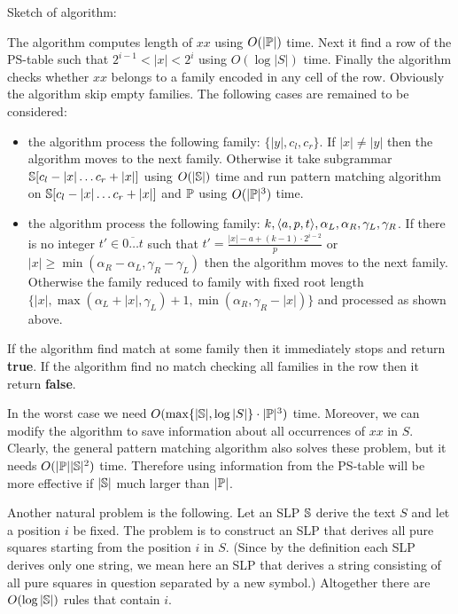 ﻿\documentclass[11pt]{article}
\begin{document}
Sketch of algorithm:

The algorithm computes length of $xx$ using $O(|\mathbb{P}|)$ time. Next it find a row of the PS-table such that
$2^{i-1} < |x| < 2^i$ using $O(\log{|S|})$ time. Finally the algorithm checks whether $xx$ belongs to a family encoded
in any cell of the row. Obviously the algorithm skip empty families. The following cases are remained to be
considered:

\begin{itemize}
  \item the algorithm process the following family: $\{|y|, c_l, c_r\}$. If $|x| \neq |y|$ then the algorithm moves to
  the next family. Otherwise it take subgrammar $\mathbb{S}[c_l - |x|\dots c_r + |x|]$ using $O(|\mathbb{S}|)$ time and run
  pattern matching algorithm on $\mathbb{S}[c_l - |x|\dots c_r + |x|]$ and $\mathbb{P}$ using $O(|\mathbb{P}|^3)$ time.
  \item the algorithm process the following family: $k, \langle a, p, t\rangle, \alpha_L, \alpha_R, \gamma_L, \gamma_R$. If
  there is no integer $t' \in \overline{0 \dots t}$ such that $t' = \frac{|x| - a + (k-1) \cdot 2^{i-2} }{p}$ or $|x|
  \geq \min(\alpha_R -\alpha_L, \gamma_R - \gamma_L)$ then the algorithm moves to the next family. Otherwise the
  family reduced to family with fixed root length $\{|x|, \max(\alpha_L + |x|, \gamma_L) + 1, \min(\alpha_R,
  \gamma_R - |x|)\}$ and processed as shown above.
\end{itemize}

If the algorithm find match at some family then it immediately stops and return \textbf{true}. If the algorithm find no
match checking all families in the row then it return \textbf{false}.

In the worst case we need $O(\max\{ |\mathbb{S}|, \log |S|\} \cdot |\mathbb{P}|^3)$ time. Moreover, we can modify the
algorithm to save information about all occurrences of $xx$ in $S$. Clearly, the general pattern matching algorithm also
solves these problem, but it needs $O(|\mathbb{P}||\mathbb{S}|^2)$ time. Therefore using information from the PS-table will be
more effective if $|\mathbb{S}|$ much larger than $|\mathbb{P}|$. 

Another natural problem is the following. Let an SLP $\mathbb{S}$ derive the text $S$ and let a position $i$ be fixed.
The problem is to construct an SLP that derives all pure squares starting from the position $i$ in $S$. (Since by the
definition each SLP derives only one string, we mean here an SLP that derives a string consisting of all pure squares
in question separated by a new symbol.)  Altogether there are $O(\log|\mathbb{S}|)$ rules that contain $i$.
\end{document}
